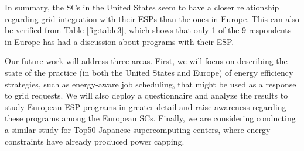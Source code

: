\documentclass{article}
\begin{document}
In summary, the SCs in the United States seem to have a closer relationship regarding grid integration with their ESPs than the ones in Europe. This can also be verified from Table \ref{fig:table3}, which shows that only 1 of the 9 respondents in Europe has had a discussion about programs with their ESP. 

Our future work will address three areas.  First, we will focus on describing the state of the practice (in both the United States and Europe) of energy efficiency strategies, such as energy-aware job scheduling, that might be used as a response to grid requests.  We will also deploy a questionnaire and analyze the results to study European ESP programs in greater detail and raise awareness regarding these programs among the European SCs. Finally, we are considering conducting a similar study for Top50 Japanese supercomputing centers, where energy constraints have already produced power capping.



\end{document}
